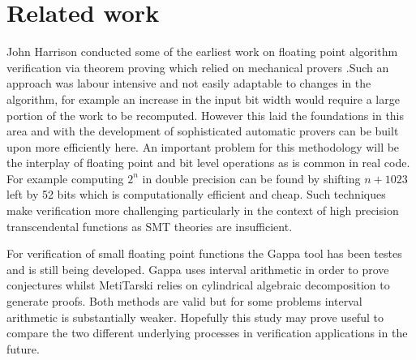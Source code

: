 \documentclass[a4]{article}
\begin{document}
\section{Related work}
John Harrison conducted some of the earliest work on floating point algorithm verification via theorem proving which relied on mechanical provers \cite{harrison1997floating}.Such an approach was labour intensive and not easily adaptable to changes in the algorithm, for example an increase in the input bit width would require a large portion of the work to be recomputed. However this laid the foundations in this area and with the development of sophisticated automatic provers can be built upon more efficiently here. An important problem for this methodology will be the interplay of floating point and bit level operations as is common in real code. For example computing $2^n$ in double precision can be found by shifting $n+1023$ left by 52 bits \cite{mine2012abstract} which is computationally efficient and cheap. Such techniques make verification more challenging particularly in the context of high precision transcendental functions \cite{lee2016verifying} as SMT theories are insufficient. 

For verification of small floating point functions the Gappa tool \cite{de2006assisted,boldo2009combining} has been testes and is still being developed. Gappa uses interval arithmetic in order to prove conjectures whilst MetiTarski relies on cylindrical algebraic decomposition to generate proofs. Both methods are valid but for some problems interval arithmetic is substantially weaker. Hopefully this study may prove useful to compare the two different underlying processes in verification applications in the future.
\end{document}
